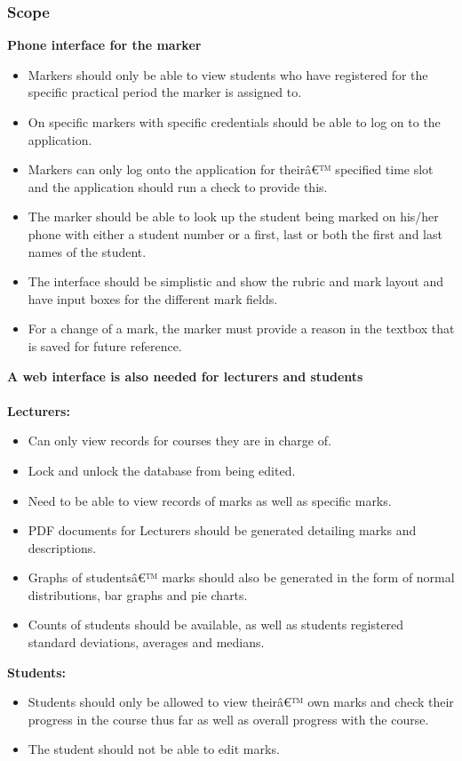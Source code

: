 \documentclass[11pt,a4paper]{article}
\begin{document}
\subsubsection{Scope}
\textbf {Phone interface for the marker}

\begin{itemize}
\item Markers should only be able to view students who have registered for the specific practical period the marker is assigned to.
\item On specific markers with specific credentials should be able to log on to the application.
\item Markers can only log onto the application for theirâ€™ specified time slot and the application should run a check to provide this.
\item The marker should be able to look up the student being marked on his/her phone with either a student number or a first, last or both the first and last names of the student.
\item The interface should be simplistic and show the rubric and mark layout and have input boxes for the different mark fields.
\item For a change of a mark, the marker must provide a reason in the textbox that is saved for future reference.
\end{itemize}
\textbf{A web interface is also needed for lecturers and students}\\\\
\textbf{Lecturers:}

\begin{itemize}
\item Can only view records for courses they are in charge of.
\item Lock and unlock the database from being edited.
\item Need to be able to view records of marks as well as specific marks.
\item PDF documents for Lecturers should be generated detailing marks and 
descriptions.
\item Graphs of studentsâ€™ marks should also be generated in the form of normal 
distributions, bar graphs and pie charts.
\item Counts of students should be available, as well as students registered standard 
deviations, averages and medians.
\end{itemize}
\textbf{Students:}
\begin{itemize}
\item Students should only be allowed to view theirâ€™ own marks and check their progress in the course thus far as well as overall progress with the course.
\item The student should not be able to edit marks.
\end{itemize}
\end{document}
